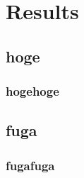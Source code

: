 \section{Results}
\subsection{hoge}
\subsubsection{hogehoge}
\subsection{fuga}
\subsubsection{fugafuga}